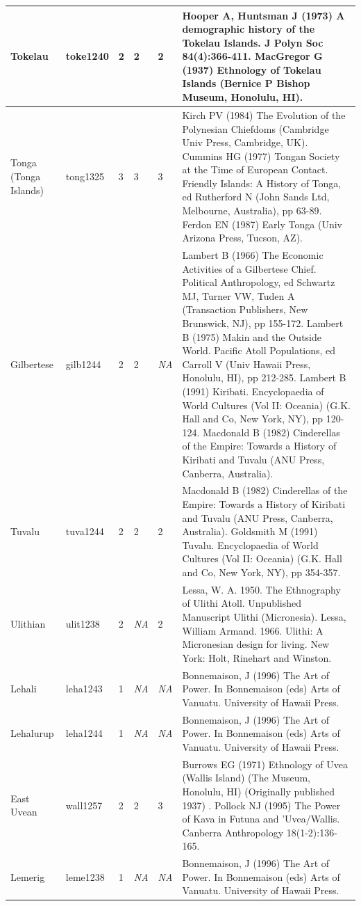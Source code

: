 \documentclass[a4paper,10pt]{article} %
\begin{document}
\begin{landscape}
\begin{longtable}{ | p{2cm}| p{2cm}| p{1.8cm}| p{1.8cm}| p{3cm}| p{9cm}| }
Tokelau&toke1240&2&2&2&Hooper A, Huntsman J (1973) A demographic history of the Tokelau Islands. J Polyn Soc 84(4):366-411. MacGregor G (1937) Ethnology of Tokelau Islands (Bernice P Bishop Museum, Honolulu, HI). \\ \hline
Tonga (Tonga Islands)&tong1325&3&3&3&Kirch PV (1984) The Evolution of the Polynesian Chiefdoms (Cambridge Univ Press, Cambridge, UK). Cummins HG (1977) Tongan Society at the Time of European Contact. Friendly Islands: A History of Tonga, ed Rutherford N (John Sands Ltd, Melbourne, Australia), pp 63-89. Ferdon EN (1987) Early Tonga (Univ Arizona Press, Tucson, AZ). \\ \hline
Gilbertese&gilb1244&2&2&\emph{NA}&Lambert B (1966) The Economic Activities of a Gilbertese Chief. Political Anthropology, ed Schwartz MJ, Turner VW, Tuden A (Transaction Publishers, New Brunswick, NJ), pp 155-172. Lambert B (1975) Makin and the Outside World. Pacific Atoll Populations, ed Carroll V (Univ Hawaii Press, Honolulu, HI), pp 212-285. Lambert B (1991) Kiribati. Encyclopaedia of World Cultures (Vol II: Oceania) (G.K. Hall and Co, New York, NY), pp 120-124. Macdonald B (1982) Cinderellas of the Empire: Towards a History of Kiribati and Tuvalu (ANU Press, Canberra, Australia). \\ \hline
Tuvalu&tuva1244&2&2&2&Macdonald B (1982) Cinderellas of the Empire: Towards a History of Kiribati and Tuvalu (ANU Press, Canberra, Australia). Goldsmith M (1991) Tuvalu. Encyclopaedia of World Cultures (Vol II: Oceania) (G.K. Hall and Co, New York, NY), pp 354-357.\\ \hline
Ulithian&ulit1238&2&\emph{NA}&2&Lessa, W. A. 1950. The Ethnography of Ulithi Atoll. Unpublished Manuscript Ulithi (Micronesia). Lessa, William Armand. 1966. Ulithi: A Micronesian design for living. New York: Holt, Rinehart and Winston.\\ \hline
Lehali&leha1243&1&\emph{NA}&\emph{NA}&Bonnemaison, J (1996) The Art of Power. In Bonnemaison (eds) Arts of Vanuatu. University of Hawaii Press.\\ \hline
Lehalurup&leha1244&1&\emph{NA}&\emph{NA}&Bonnemaison, J (1996) The Art of Power. In Bonnemaison (eds) Arts of Vanuatu. University of Hawaii Press.\\ \hline
East Uvean&wall1257&2&2&3&Burrows EG (1971) Ethnology of Uvea (Wallis Island) (The Museum, Honolulu, HI) (Originally published 1937) . Pollock NJ (1995) The Power of Kava in Futuna and 'Uvea/Wallis. Canberra Anthropology 18(1-2):136-165. \\ \hline
Lemerig&leme1238&1&\emph{NA}&\emph{NA}&Bonnemaison, J (1996) The Art of Power. In Bonnemaison (eds) Arts of Vanuatu. University of Hawaii Press.\\ \hline

\end{longtable}
\end{landscape}
\end{document}
